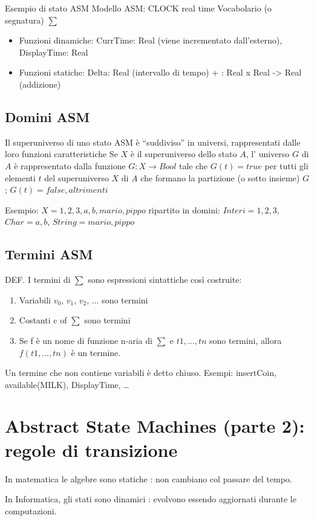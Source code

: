 \documentclass{article}
\begin{document}
Esempio di stato ASM
Modello ASM: CLOCK real time
 Vocabolario (o segnatura) $\sum$
 \begin{itemize}
   \item Funzioni dinamiche: CurrTime: Real (viene incrementato dall’esterno), DisplayTime: Real
   \item Funzioni statiche: Delta: Real (intervallo di tempo) + : Real x Real -> Real (addizione)
\end{itemize}

\subsection*{Domini ASM}
Il superuniverso di uno stato ASM è “suddiviso” in universi, rappresentati dalle loro funzioni caratteristiche Se $X$ è il superuniverso dello stato $A$, l’ universo $G$ di $A$ è rappresentato dalla funzione $G: X \rightarrow Bool$ tale che $G(t) = true$ per tutti gli elementi $t$ del superuniverso $X$ di $A$ che 
formano la partizione (o sotto insieme) $G$; $G(t) = false,altrimenti$

Esempio: $X= {1,2,3, a,b, mario, pippo}$ ripartito in domini: 
$Interi={1,2,3}$, $Char={a,b}$, $String={mario, pippo}$

\subsection*{Termini ASM}
DEF.
I termini di $\sum$ sono espressioni sintattiche così costruite:
\begin{enumerate}
    \item Variabili $v_0$, $v_1$, $v_2$, ... sono termini
    \item  Costanti c of $\sum$ sono termini 
    \item Se f è un nome di funzione n-aria di $\sum$ e $t1, . . ., tn$ sono termini, allora $f(t1, . . . , tn)$ è un termine.
\end{enumerate}

Un termine che non contiene variabili è detto chiuso. Esempi: insertCoin, available(MILK), DisplayTime, …


\section{Abstract State Machines (parte 2): regole di transizione}
In matematica le algebre sono statiche : non cambiano col passare del tempo.

In Informatica, gli stati sono dinamici : evolvono essendo aggiornati durante le computazioni.
\end{document}
